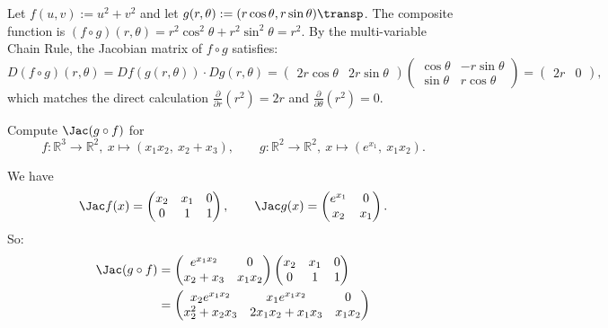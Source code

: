 \begin{aiexample}
Let $f(u,v) := u^2 + v^2$ and let $g(r,\theta) := (r\cos\theta, r\sin\theta)\transp$. The composite function is $(f \circ g)(r,\theta) = r^2\cos^2\theta + r^2\sin^2\theta = r^2$.
By the multi-variable Chain Rule, the Jacobian matrix of $f \circ g$ satisfies:
\[
D(f \circ g)(r,\theta) = Df(g(r,\theta)) \cdot Dg(r,\theta) = \begin{pmatrix} 2r\cos\theta & 2r\sin\theta \end{pmatrix} \begin{pmatrix} \cos\theta & -r\sin\theta \\ \sin\theta & r\cos\theta \end{pmatrix} = \begin{pmatrix} 2r & 0 \end{pmatrix},
\]
which matches the direct calculation $\frac{\partial}{\partial r}(r^2) = 2r$ and $\frac{\partial}{\partial \theta}(r^2) = 0$.
\end{aiexample}

\begin{exercise}
\label{ex:chain_rule_computation}
Compute $\Jac(g\circ f)$ for
\[f : \mathbb{R}^3\to\mathbb{R}^2,\ x \mapsto (x_1x_2,\ x_2+x_3), \qquad g : \mathbb{R}^2\to\mathbb{R}^2,\ x \mapsto (e^{x_1},\ x_1x_2).\]
\end{exercise}

\begin{exercisesolution}
We have
\[\Jac f(x) = \begin{pmatrix} x_2 & x_1 & 0 \\ 0 & 1 & 1\end{pmatrix}, \qquad \Jac g(x) = \begin{pmatrix} e^{x_1} & 0 \\ x_2 & x_1 \end{pmatrix}.\]
So:
\[
\begin{aligned}
\Jac(g\circ f) &= \begin{pmatrix} e^{x_1x_2} & 0 \\ x_2+x_3 & x_1x_2\end{pmatrix}\begin{pmatrix} x_2 & x_1 & 0 \\ 0 & 1 & 1\end{pmatrix} \\
&= \begin{pmatrix} x_2e^{x_1x_2} & x_1e^{x_1x_2} & 0 \\ x_2^2 + x_2x_3 & 2x_1x_2 + x_1x_3 & x_1x_2 \end{pmatrix}
\end{aligned}
\]
\end{exercisesolution}

